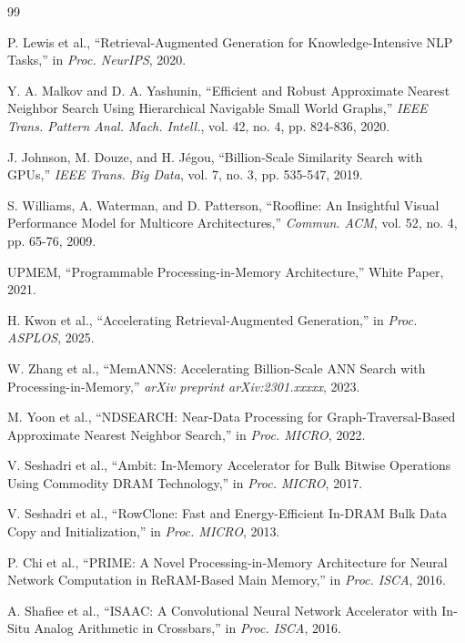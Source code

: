 \documentclass[conference]{IEEEtran}
\begin{document}
\begin{thebibliography}{99}

P. Lewis et al., ``Retrieval-Augmented Generation for Knowledge-Intensive NLP Tasks,'' in \textit{Proc. NeurIPS}, 2020.

Y. A. Malkov and D. A. Yashunin, ``Efficient and Robust Approximate Nearest Neighbor Search Using Hierarchical Navigable Small World Graphs,'' \textit{IEEE Trans. Pattern Anal. Mach. Intell.}, vol. 42, no. 4, pp. 824-836, 2020.

J. Johnson, M. Douze, and H. Jégou, ``Billion-Scale Similarity Search with GPUs,'' \textit{IEEE Trans. Big Data}, vol. 7, no. 3, pp. 535-547, 2019.

S. Williams, A. Waterman, and D. Patterson, ``Roofline: An Insightful Visual Performance Model for Multicore Architectures,'' \textit{Commun. ACM}, vol. 52, no. 4, pp. 65-76, 2009.

UPMEM, ``Programmable Processing-in-Memory Architecture,'' White Paper, 2021.

H. Kwon et al., ``Accelerating Retrieval-Augmented Generation,'' in \textit{Proc. ASPLOS}, 2025.

W. Zhang et al., ``MemANNS: Accelerating Billion-Scale ANN Search with Processing-in-Memory,'' \textit{arXiv preprint arXiv:2301.xxxxx}, 2023.

M. Yoon et al., ``NDSEARCH: Near-Data Processing for Graph-Traversal-Based Approximate Nearest Neighbor Search,'' in \textit{Proc. MICRO}, 2022.

V. Seshadri et al., ``Ambit: In-Memory Accelerator for Bulk Bitwise Operations Using Commodity DRAM Technology,'' in \textit{Proc. MICRO}, 2017.

V. Seshadri et al., ``RowClone: Fast and Energy-Efficient In-DRAM Bulk Data Copy and Initialization,'' in \textit{Proc. MICRO}, 2013.

P. Chi et al., ``PRIME: A Novel Processing-in-Memory Architecture for Neural Network Computation in ReRAM-Based Main Memory,'' in \textit{Proc. ISCA}, 2016.

A. Shafiee et al., ``ISAAC: A Convolutional Neural Network Accelerator with In-Situ Analog Arithmetic in Crossbars,'' in \textit{Proc. ISCA}, 2016.


\end{thebibliography}
\end{document}
